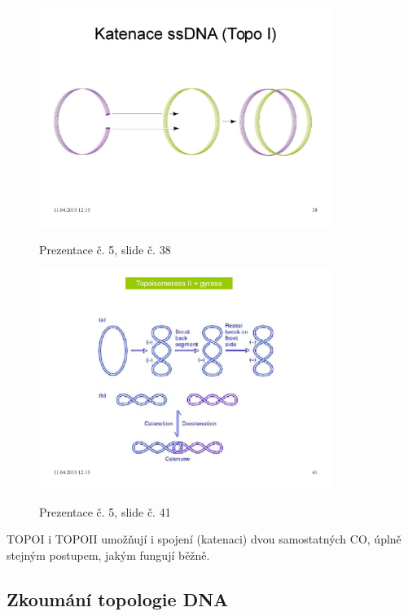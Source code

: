 \documentclass[DIV=8]{scrreprt}
\begin{document}
\begin{figure}
    \caption{Prezentace č. 5, slide č. 38}
    \includegraphics[width=0.85\textwidth]{slides-5/slide-38.jpg}
    \centering
    \label{slides-5-slide-38}
\end{figure}
\begin{figure}
    \caption{Prezentace č. 5, slide č. 41}
    \includegraphics[width=0.85\textwidth]{slides-5/slide-41.jpg}
    \centering
    \label{slides-5-slide-41}
\end{figure}
 TOPOI i TOPOII umožňují i spojení (katenaci) dvou samostatných CO, úplně stejným postupem, jakým fungují běžně.

\subsection{Zkoumání topologie DNA} \label{Zkoumání topologie DNA}
\end{document}
